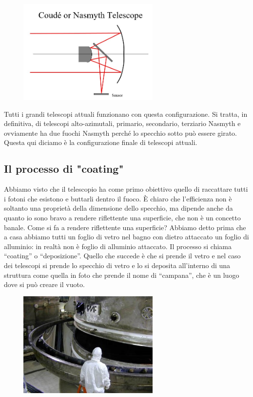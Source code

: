 \documentclass[a4paper,11pt]{article}
\begin{document}
\begin{figure}[h!!]
        \centering
        \includegraphics[width=7cm]{14.jpg}
        \label{}
    \end{figure}

Tutti i grandi telescopi attuali funzionano con questa configurazione. Si tratta, in definitiva, di telescopi alto-azimutali, primario, secondario, terziario Nasmyth e ovviamente ha due fuochi Nasmyth perché lo specchio sotto può essere girato.\\
Questa qui diciamo è la configurazione finale di telescopi attuali.

\subsection{Il processo di "coating"}
Abbiamo visto che il telescopio ha come primo obiettivo quello di raccattare tutti i fotoni che esistono e buttarli dentro il fuoco. È chiaro che l’efficienza non è soltanto una proprietà della dimensione dello specchio, ma dipende anche da quanto io sono bravo a rendere riflettente una superficie, che non è un concetto banale. Come si fa a rendere riflettente una superficie? Abbiamo detto prima che a casa abbiamo tutti un foglio di vetro nel bagno con dietro attaccato un foglio di alluminio: in realtà non è foglio di alluminio attaccato. Il processo si chiama “coating” o “deposizione”. Quello che succede è che si prende il vetro e nel caso dei telescopi si prende lo specchio di vetro e lo si deposita all’interno di una struttura come quella in foto che prende il nome di “campana”, che è un luogo dove si può creare il vuoto. 
\begin{figure}[h!!]
        \centering
        \includegraphics[width=7cm]{15.jpg}
        \label{}
    \end{figure}
\end{document}
